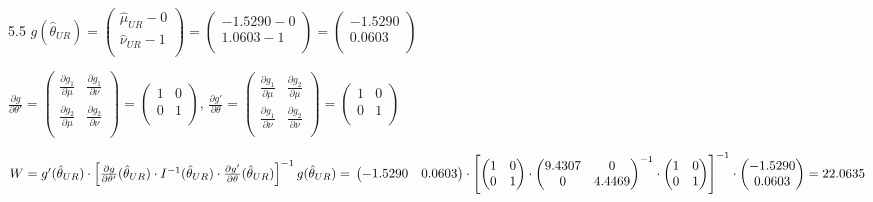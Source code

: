 \begin{solution}{{5.5}}
$g(\hat{\theta}_{UR}) = \begin{pmatrix}
\hat{\mu}_{UR} - 0 \\
\hat{\nu}_{UR} - 1 \\
\end{pmatrix} = \begin{pmatrix}
-1.5290 - 0\\
1.0603 - 1 \\
\end{pmatrix} = \begin{pmatrix}
-1.5290\\
0.0603 \\
\end{pmatrix}$

$\frac{\partial g}{\partial \theta'} = \begin{pmatrix}
\frac{\partial g_1}{\partial \mu} & \frac{\partial g_1}{\partial \nu} \\
\frac{\partial g_2}{\partial \mu} & \frac{\partial g_2}{\partial \nu} \\
\end{pmatrix} = \begin{pmatrix}
1 & 0\\
0 & 1\\
\end{pmatrix}$, $\frac{\partial g'}{\partial \theta} = \begin{pmatrix}
\frac{\partial g_1}{\partial \mu} & \frac{\partial g_2}{\partial \mu} \\
\frac{\partial g_1}{\partial \nu} & \frac{\partial g_2}{\partial \nu} \\
\end{pmatrix} = \begin{pmatrix}
1 & 0\\
0 & 1\\
\end{pmatrix}$

$W = g'(\hat{\theta}_{UR}) \cdot \left[ \frac{\partial g}{\partial \theta'}(\hat{\theta}_{UR}) \cdot I^{-1}(\hat{\theta}_{UR}) \cdot \frac{\partial g'}{\partial \theta}(\hat{\theta}_{UR}) \right]^{-1} g(\hat{\theta}_{UR}) = \\
\begin{pmatrix}
-1.5290 & 0.0603\\
\end{pmatrix} \cdot \left[ \begin{pmatrix}
1 & 0\\
0 & 1\\
\end{pmatrix} \cdot \begin{pmatrix}
9.4307 & 0 \\
0 & 4.4469 \\
\end{pmatrix}^{-1} \cdot \begin{pmatrix}
1 & 0\\
0 & 1\\
\end{pmatrix} \right]^{-1} \cdot  \begin{pmatrix}
-1.5290\\
0.0603 \\
\end{pmatrix} = 22.0635$


\end{solution}
